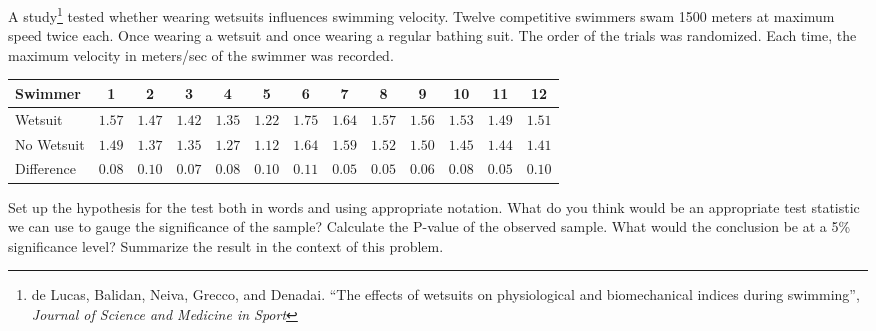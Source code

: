 \clearpage


\bb[resume]
\ii A study\footnote{de Lucas, Balidan, Neiva, Grecco, and Denadai. ``The effects of wetsuits on physiological and biomechanical indices during swimming'', \textit{Journal of Science and Medicine in Sport}} tested whether wearing wetsuits influences swimming velocity. Twelve competitive swimmers swam 1500 meters at maximum speed twice each. Once wearing a wetsuit and once wearing a regular bathing suit. The order of the trials was randomized. Each time, the maximum velocity in meters/sec of the swimmer was recorded.

\vspace{0.25in}

\begin{tabular}{|l||c|c|c|c|c|c|c|c|c|c|c|c|}
Swimmer & 1 & 2 & 3 & 4 & 5 & 6 & 7 & 8 & 9 & 10 & 11 & 12 \\
\hline
Wetsuit & $1.57$ & $1.47$ & $1.42$ & $1.35$ & $1.22$ & $1.75$ & $1.64$ & $1.57$ & $1.56$ & $1.53$ & $1.49$ & $1.51$ \\
No Wetsuit & $1.49$ & $1.37$ & $1.35$ & $1.27$ & $1.12$ & $1.64$ & $1.59$ & $1.52$ & $1.50$ & $1.45$ & $1.44$ & $1.41$ \\
\hline
Difference & $0.08$ &  $0.10$ &  $0.07$ &  $0.08$ &  $0.10$ & $0.11$ & $0.05$ & $0.05$ & $0.06$ & $0.08$ & $0.05$ &  $0.10$
\end{tabular}

\bb
\ii Set up the hypothesis for the test both in words and using appropriate notation. \vspace{0.6in}
\ii What do you think would be an appropriate test statistic we can use to gauge the significance of the sample?  \vfill 
\ii Calculate the P-value of the observed sample.  \vfill
\ii What would the conclusion  be at a 5\% significance level? Summarize the result in the context of this problem.  \vspace{0.5in}
\ee
\ee

